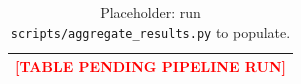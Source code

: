 \begin{table}[!t]
\centering
\caption{Placeholder: run \texttt{scripts/aggregate\_results.py} to populate.}
\label{tab:external}
\begin{tabular}{c}
\toprule
\textcolor{red}{\textbf{[TABLE PENDING PIPELINE RUN]}} \\
\bottomrule
\end{tabular}
\end{table}
